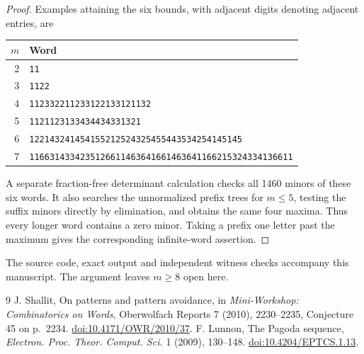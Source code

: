 \documentclass[11pt]{article}
\begin{document}
\begin{proof}
Examples attaining the six bounds, with adjacent digits denoting adjacent entries, are
\begin{center}\small
\begin{tabular}{rl}\toprule
$m$&Word\\\midrule
2&\texttt{11}\\
3&\texttt{1122}\\
4&\texttt{112332211233122133121132}\\
5&\texttt{1121123133434434331321}\\
6&\texttt{122143241454155212524325455443534254145145}\\
7&\texttt{1166314334235126611463641661463641166215324334136611}\\\bottomrule
\end{tabular}
\end{center}
A separate fraction-free determinant calculation checks all 1460 minors of these six words. It also searches the unnormalized prefix trees for $m\le5$, testing the suffix minors directly by elimination, and obtains the same four maxima. Thus every longer word contains a zero minor. Taking a prefix one letter past the maximum gives the corresponding infinite-word assertion.
\end{proof}

The source code, exact output and independent witness checks accompany this manuscript. The argument leaves $m\ge8$ open here.
\begin{thebibliography}{9}
 J. Shallit, On patterns and pattern avoidance, in \emph{Mini-Workshop: Combinatorics on Words}, Oberwolfach Reports 7 (2010), 2230--2235, Conjecture 45 on p.~2234. \href{https://doi.org/10.4171/OWR/2010/37}{doi:10.4171/OWR/2010/37}.
 F. Lunnon, The Pagoda sequence, \emph{Electron. Proc. Theor. Comput. Sci.} 1 (2009), 130--148. \href{https://doi.org/10.4204/EPTCS.1.13}{doi:10.4204/EPTCS.1.13}.
\end{thebibliography}
\end{document}
